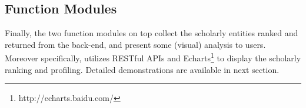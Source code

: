 \subsection{Function Modules}
Finally, the two function modules on top collect the scholarly entities ranked and returned from the back-end, and present some (visual) analysis to users. Moreover specifically, \oursystem utilizes RESTful APIs  and Echarts\footnote{http://echarts.baidu.com/} to display the scholarly ranking and profiling. Detailed demonstrations are available in next section.






